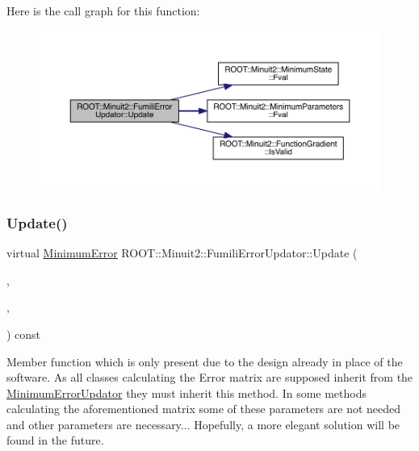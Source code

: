 Here is the call graph for this function\+:
\nopagebreak
\begin{figure}[H]
\begin{center}
\leavevmode
\includegraphics[width=350pt]{d1/d6b/classROOT_1_1Minuit2_1_1FumiliErrorUpdator_ae5ee7f2052c474169dd19ffbc3755bd3_cgraph}
\end{center}
\end{figure}
\mbox{\label{classROOT_1_1Minuit2_1_1FumiliErrorUpdator_a7a634a18816d8cdc6db8d92b27b69095}} 
\subsubsection{\texorpdfstring{Update()}{Update()}\hspace{0.1cm}{\footnotesize\ttfamily [6/6]}}
{\footnotesize\ttfamily virtual \mbox{\hyperlink{classROOT_1_1Minuit2_1_1MinimumError}{Minimum\+Error}} R\+O\+O\+T\+::\+Minuit2\+::\+Fumili\+Error\+Updator\+::\+Update (\begin{DoxyParamCaption}\item[{const \mbox{\hyperlink{classROOT_1_1Minuit2_1_1MinimumState}{Minimum\+State}} \&}]{,  }\item[{const \mbox{\hyperlink{classROOT_1_1Minuit2_1_1MinimumParameters}{Minimum\+Parameters}} \&}]{,  }\item[{const \mbox{\hyperlink{classROOT_1_1Minuit2_1_1FunctionGradient}{Function\+Gradient}} \&}]{ }\end{DoxyParamCaption}) const\hspace{0.3cm}{\ttfamily [virtual]}}

Member function which is only present due to the design already in place of the software. As all classes calculating the Error matrix are supposed inherit from the \mbox{\hyperlink{classROOT_1_1Minuit2_1_1MinimumErrorUpdator}{Minimum\+Error\+Updator}} they must inherit this method. In some methods calculating the aforementioned matrix some of these parameters are not needed and other parameters are necessary... Hopefully, a more elegant solution will be found in the future.

